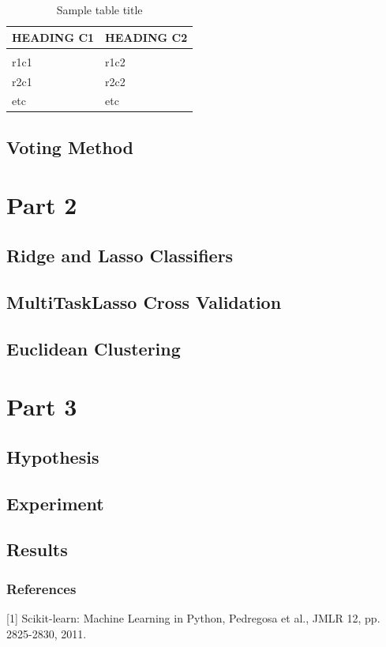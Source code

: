 \documentclass{article} %
\begin{document}
\begin{table}[t]
\caption{Sample table title}
\label{sample-table}
\begin{center}
\begin{tabular}{ll}
\multicolumn{1}{c}{\bf HEADING C1}  &\multicolumn{1}{c}{\bf HEADING C2}
\\ \hline \\
r1c1   &r1c2       \\
r2c1   &r2c2 \\
etc		&etc\\
\end{tabular}
\end{center}
\end{table}

\subsection{Voting Method}

\section{Part 2}
\subsection{Ridge and Lasso Classifiers}
\subsection{MultiTaskLasso Cross Validation}
\subsection{Euclidean Clustering}


\section{Part 3}

\subsection{Hypothesis}

\subsection{Experiment}

\subsection{Results}




\subsubsection*{References}

\small{
[1] Scikit-learn: Machine Learning in Python, Pedregosa et al., JMLR 12, pp. 2825-2830, 2011.
}
\end{document}
